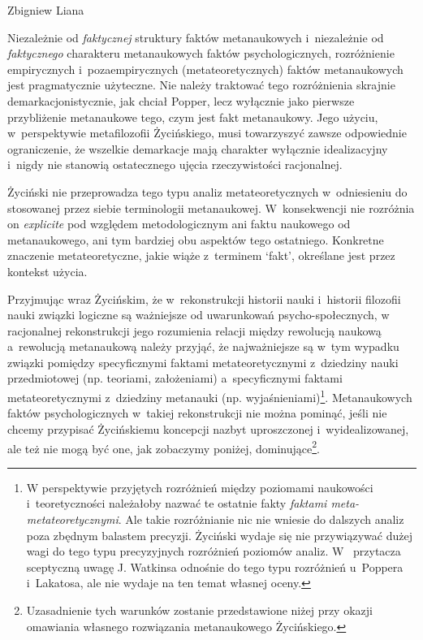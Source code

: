 \begin{artplenv}{Zbigniew Liana}
\begin{uwaga}
Niezależnie od \textit{faktycznej} struktury faktów metanaukowych i~niezależnie od \textit{faktycznego} charakteru
metanaukowych faktów psychologicznych, rozróżnienie empirycznych i~pozaempirycznych (metateoretycznych) faktów
metanaukowych jest pragmatycznie użyteczne. Nie należy traktować tego rozróżnienia skrajnie demarkacjonistycznie, jak
chciał Popper, lecz wyłącznie jako pierwsze przybliżenie metanaukowe tego, czym jest fakt metanaukowy. Jego użyciu, w~perspektywie
metafilozofii Życińskiego, musi towarzyszyć zawsze odpowiednie ograniczenie, że wszelkie demarkacje mają
charakter wyłącznie idealizacyjny i~nigdy nie stanowią ostatecznego ujęcia rzeczywistości racjonalnej.
\end{uwaga}

\begin{uwaga}
Życiński nie przeprowadza tego typu analiz metateoretycznych w~odniesieniu do stosowanej przez siebie
terminologii metanaukowej. W~konsekwencji nie rozróżnia on \textit{explicite} pod względem metodologicznym ani faktu
naukowego od metanaukowego, ani tym bardziej obu aspektów tego ostatniego. Konkretne znaczenie metateoretyczne,
jakie wiąże z~terminem `fakt', określane jest przez kontekst użycia.
\end{uwaga}
	
Przyjmując wraz Życińskim, że w~rekonstrukcji historii nauki i~historii filozofii nauki związki logiczne są ważniejsze
od uwarunkowań psycho-społecznych, w racjonalnej rekonstrukcji jego rozumienia relacji między rewolucją naukową a~rewolucją
metanaukową należy przyjąć, że najważniejsze są w~tym wypadku związki pomiędzy specyficznymi faktami
metateoretycznymi z~dziedziny nauki przedmiotowej (np. teoriami, założeniami) a~specyficznymi faktami metateoretycznymi z~dziedziny
metanauki (np. wyjaśnieniami)\footnote{W perspektywie przyjętych rozróżnień między poziomami naukowości i~teoretyczności
należałoby nazwać te ostatnie fakty \textit{faktami meta-metateoretycznymi}. Ale takie rozróżnianie nic
nie wniesie do dalszych analiz poza zbędnym balastem precyzji. Życiński wydaje się nie przywiązywać dużej wagi do tego
typu precyzyjnych rozróżnień poziomów analiz.
W~\parencite[s.~123]{zycinski_jezyk_1983}
przytacza sceptyczną uwagę J. Watkinsa odnośnie do tego typu rozróżnień u~Poppera i~Lakatosa, ale nie wydaje na
ten temat własnej oceny.}. Metanaukowych faktów psychologicznych w~takiej rekonstrukcji nie można pominąć, jeśli nie
chcemy przypisać Życińskiemu koncepcji nazbyt uproszczonej i~wyidealizowanej, ale też nie mogą być one, jak zobaczymy
poniżej, dominujące\footnote{Uzasadnienie tych warunków zostanie przedstawione niżej przy okazji omawiania własnego
rozwiązania metanaukowego Życińskiego.}.


\end{artplenv}
